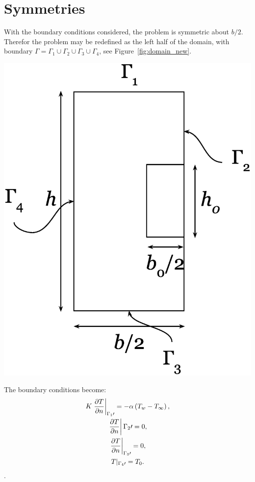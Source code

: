 \section{Symmetries}
With the boundary conditions considered, the problem is symmetric about $b/2$. Therefor the problem may be redefined as the left half of the domain, with boundary $\Gamma=\Gamma_1\cup\Gamma_2\cup\Gamma_3\cup\Gamma_4$, see Figure~\ref{fig:domain_new}. \begin{Figure}
 \centerfloat
 \includegraphics[width=0.7\linewidth]{domain_new.eps}
 \label{fig:domain_new}
\end{Figure} The boundary conditions become:
\begin{equation}
\begin{gathered}
    K\left.\frac{\partial T}{\partial n}\right|_{\Gamma_1\prime} = -\alpha \left(T_w - T_{\infty}\right),\\
    \left.\frac{\partial T}{\partial n}\right|{\Gamma_2\prime} = 0,\\
    \left.\frac{\partial T}{\partial n}\right|_{\Gamma_3\prime} = 0,\\
    T\arrowvert_{\Gamma_4\prime} = T_0.
\end{gathered}\label{eq:bc}
\end{equation}.



